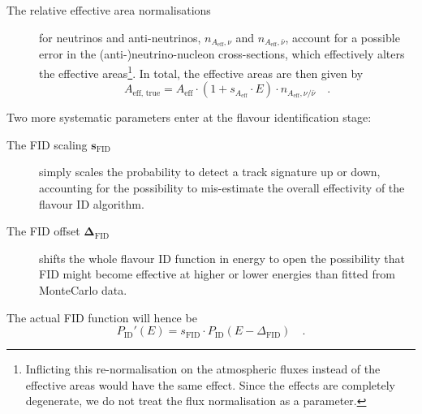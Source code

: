 \begin{description}
 \item[The relative effective area normalisations] for neutrinos
  and anti-neutrinos, $n_{A_\mathrm{eff},\nu}$ and $n_{A_\mathrm{eff},\bar\nu}$,
  account for a possible error in the (anti-)neutrino-nucleon cross-sections,
  which effectively alters the effective areas\footnote{Inflicting this
  re-normalisation on the atmospheric fluxes instead of the effective areas
  would have the same effect. Since the effects are completely degenerate, we do
  not treat the flux normalisation as a parameter.}. In total, the effective
  areas are then given by
  \begin{equation}
   A_\mathrm{eff,\,true} = A_\mathrm{eff}
                           \cdot\left(1+s_{A_\mathrm{eff}}\cdot E\right)
                           \cdot n_{A_\mathrm{eff},\nu/\bar\nu}\quad.
  \end{equation}
\end{description}



Two more systematic parameters enter at the flavour identification stage:
\begin{description}
 \item[The FID scaling $\mathbf{s_\mathrm{FID}}$] simply scales the probability
  to detect a track signature up or down, accounting for the possibility to
  mis-estimate the overall effectivity of the flavour ID algorithm.
 \item[The FID offset $\mathbf{\Delta_\mathrm{FID}}$] shifts the whole flavour
  ID function in energy to open the possibility that FID might become effective
  at higher or lower energies than fitted from MonteCarlo data.
\end{description}
The actual FID function will hence be
\begin{equation}
 P_\mathrm{ID}'(E) = s_\mathrm{FID}\cdot P_\mathrm{ID}(E-\Delta_\mathrm{FID})
   \quad.
\end{equation}

